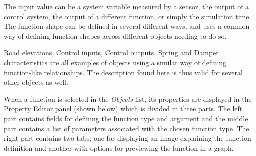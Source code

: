 

The input value can be a system variable measured by a sensor, the
output of a control system, the output of a different function, or
simply the simulation time. The function shape can be defined in several
different ways, and uses a common way of defining function shapes across
different objects needing to do so.

Road elevations, Control inputs, Control outputs, Spring and Damper
characteristics are all examples of objects using a similar way of
defining function-like relationships. The description found here is thus
valid for several other objects as well.





\clearpage



When a function is selected in the {\sl Objects} list, its properties are
displayed in the Property Editor panel (shown below) which is divided in three
parts. The left part contains fields for defining the function type and
argument and the middle part contains a list of parameters associated with the
chosen function type. The right part contains two tabs; one for displaying an
image explaining the function definition and another with options for previewing
the function in a graph.

